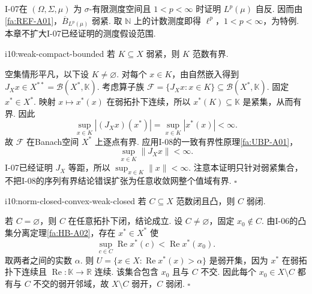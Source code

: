\begin{FAExample}
I-07在 \(\displaystyle (\Omega,\Sigma,\mu)\) 为 \(\displaystyle \sigma\)-有限测度空间且 \(\displaystyle 1<p<\infty\) 时证明 \(\displaystyle L^p(\mu)\) 自反. 因而由\autoref{fa:REF-A01}，\(\displaystyle \overline B_{L^p(\mu)}\) 弱紧. 取 \(\displaystyle \mathbb N\) 上的计数测度即得 \(\displaystyle \ell^p\)，\(\displaystyle 1<p<\infty\)，为特例. 本章不扩大I-07已经证明的测度假设范围.
\end{FAExample}

\begin{FAProposition}[B][弱紧集必范数有界]{i10:weak-compact-bounded}
若 \(\displaystyle K\subseteq X\) 弱紧，则 \(\displaystyle K\) 范数有界.
\end{FAProposition}

\begin{FAProof}
空集情形平凡，以下设 \(\displaystyle K\neq\varnothing\). 对每个 \(\displaystyle x\in K\)，由自然嵌入得到 \(\displaystyle J_Xx\in X^{**}=\mathcal B(X^*,\mathbb K)\). 考虑算子族
\(\displaystyle \mathcal F=\{J_Xx:x\in K\}\subseteq\mathcal B(X^*,\mathbb K)\).
固定 \(\displaystyle x^*\in X^*\). 映射 \(\displaystyle x\mapsto x^*(x)\) 在弱拓扑下连续，所以 \(\displaystyle x^*(K)\subseteq\mathbb K\) 是紧集，从而有界. 因此
\[
\sup_{x\in K}|(J_Xx)(x^*)|
=
\sup_{x\in K}|x^*(x)|
<\infty.
\]
故 \(\displaystyle \mathcal F\) 在Banach空间 \(\displaystyle X^*\) 上逐点有界. 应用I-08的一致有界性原理\autoref{fa:UBP-A01}，
\[
\sup_{x\in K}\|J_Xx\|<\infty.
\]
I-07已经证明 \(\displaystyle J_X\) 等距，所以 \(\displaystyle \sup_{x\in K}\|x\|<\infty\). 注意本证明只针对弱紧集合，不把I-08的序列有界结论错误扩张为任意收敛网整个值域有界.
\hfill\(\square\)
\end{FAProof}

\begin{FAProposition}[B][范数闭凸集是弱闭集]{i10:norm-closed-convex-weak-closed}
若 \(\displaystyle C\subseteq X\) 范数闭且凸，则 \(\displaystyle C\) 弱闭.
\end{FAProposition}

\begin{FAProof}
若 \(\displaystyle C=\varnothing\)，则 \(\displaystyle C\) 在任意拓扑下闭，结论成立. 设 \(\displaystyle C\neq\varnothing\)，固定 \(\displaystyle x_0\notin C\). 由I-06的凸集分离定理\autoref{fa:HB-A02}，存在 \(\displaystyle x^*\in X^*\) 使
\[
\sup_{c\in C}\operatorname{Re}x^*(c)
<
\operatorname{Re}x^*(x_0).
\]
取两者之间的实数 \(\displaystyle \alpha\). 则
\(\displaystyle U=\{x\in X:\operatorname{Re}x^*(x)>\alpha\}\)
是弱开集，因为 \(\displaystyle x^*\) 在弱拓扑下连续且 \(\displaystyle \operatorname{Re}:\mathbb K\to\mathbb R\) 连续. 该集合包含 \(\displaystyle x_0\) 且与 \(\displaystyle C\) 不交. 因此每个 \(\displaystyle x_0\in X\setminus C\) 都有与 \(\displaystyle C\) 不交的弱开邻域，故 \(\displaystyle X\setminus C\) 弱开，\(\displaystyle C\) 弱闭.
\hfill\(\square\)
\end{FAProof}

